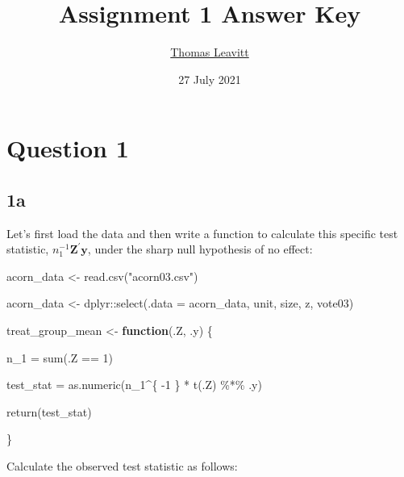 \documentclass[
  12pt,
  leqno]{article}
\title{Assignment 1 Answer Key}
\author{\href{mailto:tl2624@columbia.edu}{Thomas Leavitt}}
\date{27 July 2021}
\newenvironment{Shaded}{\begin{snugshade}}{\end{snugshade}}
\newcommand{\AttributeTok}[1]{\textcolor[rgb]{0.77,0.63,0.00}{#1}}
\newcommand{\ControlFlowTok}[1]{\textcolor[rgb]{0.13,0.29,0.53}{\textbf{#1}}}
\newcommand{\DecValTok}[1]{\textcolor[rgb]{0.00,0.00,0.81}{#1}}
\newcommand{\FunctionTok}[1]{\textcolor[rgb]{0.00,0.00,0.00}{#1}}
\newcommand{\NormalTok}[1]{#1}
\newcommand{\OtherTok}[1]{\textcolor[rgb]{0.56,0.35,0.01}{#1}}
\newcommand{\SpecialCharTok}[1]{\textcolor[rgb]{0.00,0.00,0.00}{#1}}
\newcommand{\StringTok}[1]{\textcolor[rgb]{0.31,0.60,0.02}{#1}}
\DeclareMathOperator{\1}{\mathbbm{1}}
\begin{document}
\maketitle

\section*{Question 1}

\subsection*{1a}

Let's first load the data and then write a function to calculate this
specific test statistic, \(n_1^{-1}\mathbf{Z}^{\prime}\mathbf{y}\),
under the sharp null hypothesis of no effect:

\scriptsize

\begin{Shaded}
\begin{Highlighting}[]
\NormalTok{acorn\_data }\OtherTok{\textless{}{-}} \FunctionTok{read.csv}\NormalTok{(}\StringTok{"acorn03.csv"}\NormalTok{)}

\NormalTok{acorn\_data }\OtherTok{\textless{}{-}}\NormalTok{ dplyr}\SpecialCharTok{::}\FunctionTok{select}\NormalTok{(}\AttributeTok{.data =}\NormalTok{ acorn\_data, unit, size, z, vote03)}

\NormalTok{treat\_group\_mean }\OtherTok{\textless{}{-}} \ControlFlowTok{function}\NormalTok{(.Z, .y) \{}

\NormalTok{    n\_1 }\OtherTok{=} \FunctionTok{sum}\NormalTok{(.Z }\SpecialCharTok{==} \DecValTok{1}\NormalTok{)}

\NormalTok{    test\_stat }\OtherTok{=} \FunctionTok{as.numeric}\NormalTok{(n\_1}\SpecialCharTok{\^{}}\NormalTok{\{}
        \SpecialCharTok{{-}}\DecValTok{1}
\NormalTok{    \} }\SpecialCharTok{*} \FunctionTok{t}\NormalTok{(.Z) }\SpecialCharTok{\%*\%}\NormalTok{ .y)}

    \FunctionTok{return}\NormalTok{(test\_stat)}

\NormalTok{\}}
\end{Highlighting}
\end{Shaded}

\normalsize

Calculate the observed test statistic as follows: \scriptsize

\begin{Shaded}
\end{Shaded}
\end{document}
